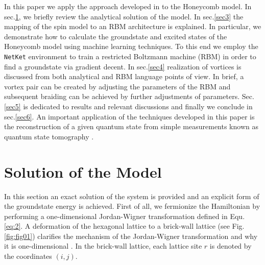 \documentclass{article}
\begin{document}
In this paper we apply the approach developed in \cite{Deng_2017} to the Honeycomb model. In sec.\hspace{0.2mm}\ref{sec2}, we briefly review the analytical solution of the model. In sec.\hspace{0.2mm}\ref{sec3} the mapping of the spin model to an RBM architecture is explained. In particular, we demonstrate how to calculate the groundstate and excited states of the Honeycomb model using machine learning techniques. To this end we employ the \texttt{NetKet} environment \cite{netket:2019} to train a restricted Boltzmann machine (RBM) in order to find a groundstate via gradient decent. In sec.\hspace{0.2mm}\ref{sec4} realization of vortices is discussed from both analytical and RBM language points of view. In brief, a vortex pair can be created by adjusting the parameters of the RBM and subsequent braiding can be achieved by further adjustments of parameters. Sec.\hspace{0.2mm}\ref{sec5} is dedicated to results and relevant discussions and finally we conclude in sec.\hspace{0.2mm}\ref{sec6}. An important application of the techniques developed in this paper is the reconstruction of a given quantum state from simple measurements known as quantum state tomography \cite{Torlai_2018}.






\section{Solution of the Model}\label{sec2}

In this section an exact solution of the system is provided and an explicit form of the groundstate energy is achieved. First of all, we fermionize the Hamiltonian by performing a one-dimensional Jordan-Wigner transformation \cite{Jordan:1928wi} defined in Equ.\hspace{0.2mm}\ref{eq:2}. A deformation of the hexagonal lattice to a brick-wall lattice (see Fig.\hspace{0.2mm}\ref{fig:fig01})  clarifies the mechanism of the Jordan-Wigner transformation and why it is one-dimensional \cite{Chen_2008}. In the brick-wall lattice, each lattice site $r$ is denoted by the coordinates $(i,j)$.
\end{document}
